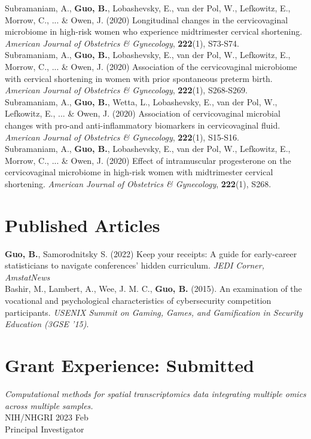 Subramaniam, A., \textbf{Guo, B.}, Lobashevsky, E., van der Pol, W., Lefkowitz, E., Morrow, C., ... \& Owen, J.  (2020)  Longitudinal changes in the cervicovaginal microbiome in high-risk women who experience midtrimester cervical shortening. \textit{American Journal of Obstetrics \& Gynecology}, {\bf 222}(1), S73-S74.\\

Subramaniam, A., \textbf{Guo, B.}, Lobashevsky, E., van der Pol, W., Lefkowitz, E., Morrow, C., ... \& Owen, J.   (2020) Association of the cervicovaginal microbiome with cervical shortening in women with prior spontaneous preterm birth. \textit{American Journal of Obstetrics \& Gynecology}, {\bf 222}(1), S268-S269.\\

Subramaniam, A., \textbf{Guo, B.}, Wetta, L., Lobashevsky, E., van der Pol, W., Lefkowitz, E., ... \& Owen, J.  (2020) Association of cervicovaginal microbial changes with pro-and anti-inflammatory biomarkers in cervicovaginal fluid. \textit{American Journal of Obstetrics \& Gynecology}, {\bf 222}(1), S15-S16.\\

Subramaniam, A., \textbf{Guo, B.}, Lobashevsky, E., van der Pol, W., Lefkowitz, E., Morrow, C., ... \& Owen, J.  (2020) Effect of intramuscular progesterone on the cervicovaginal microbiome in high-risk women with midtrimester cervical shortening. \textit{American Journal of Obstetrics \& Gynecology}, {\bf 222}(1), S268.\\

\section{Published Articles}

\textbf{Guo, B.}, Samorodnitsky S. (2022) Keep your receipts: A guide for early-career statisticians to navigate conferences’ hidden curriculum. \textit{JEDI Corner, AmstatNews}\\

Bashir, M., Lambert, A., Wee, J. M. C., \textbf{Guo, B.} (2015). An examination of the vocational and psychological characteristics of cybersecurity competition participants. \textit{USENIX Summit on Gaming, Games, and Gamification in Security Education (3GSE '15)}.


\section{Grant Experience: Submitted}
\textit{Computational methods for spatial transcriptomics data integrating multiple omics across multiple samples.}\\[0.0em]
  NIH/NHGRI \hfill {}  2023 Feb\\
 Principal Investigator







